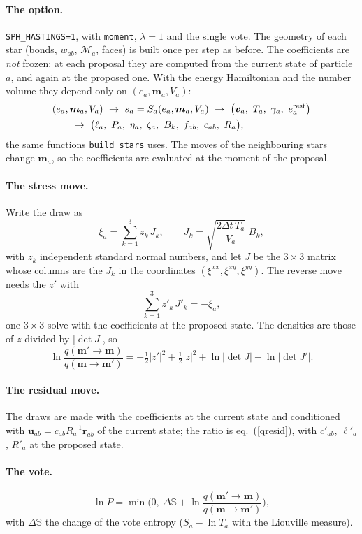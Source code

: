 \documentclass[11pt,aps,preprint,nofootinbib,superscriptaddress,tightenlines]{revtex4-2}
\def\st{\begin{equation}}
\def\stp{\end{equation}}
\def\Eq#1{eq.~(\ref{#1})}
\let\oldparagraph\paragraph
\renewcommand{\paragraph}{\par\bigskip\oldparagraph}
\begin{document}
\paragraph{The option.}  \texttt{SPH\_HASTINGS=1}, with \texttt{moment}, $\lambda=1$ and the single vote.  The geometry of each star (bonds, $w_{ab}$, $\mathcal M_a$, faces) is
built once per step as before.  The coefficients are \emph{not} frozen: at each proposal they are computed from the current state of
particle $a$, and again at the proposed one.  With the energy Hamiltonian and the number volume they depend only on $(e_a,\bm m_a,V_a)$:
\st
\begin{aligned}
&(e_a,\bm m_a,V_a)\ \to\ s_a=S_a(e_a,\bm m_a,V_a)\ \to\ \big(\bm v_a,\ T_a,\ \gamma_a,\ e^{\rm rest}_a\big)\\
&\qquad\to\ \big(\ell_a,\ P_a,\ \eta_a,\ \zeta_a,\ B_k,\ f_{ab},\ c_{ab},\ R_a\big) ,
\end{aligned}
\stp
the same functions \texttt{build\_stars} uses.  The moves of the neighbouring stars change $\bm m_a$, so the coefficients are evaluated at
the moment of the proposal.

\paragraph{The stress move.}  Write the draw as
\st
\xi_a=\sum_{k=1}^3z_k\,J_k,\qquad J_k=\sqrt{\frac{2\Delta t\,T_a}{V_a}}\;B_k ,
\stp
with $z_k$ independent standard normal numbers, and let $J$ be the $3\times3$ matrix whose columns are the $J_k$ in the coordinates
$(\xi^{xx},\xi^{xy},\xi^{yy})$.  The reverse move needs the $z'$ with
\st
\sum_{k=1}^3z'_k\,J'_k=-\xi_a ,
\stp
one $3\times3$ solve with the coefficients at the proposed state.  The densities are those of $z$ divided by $|\det J|$, so
\st
\ln\frac{q(\bm m'\to\bm m)}{q(\bm m\to\bm m')}=-\tfrac12|z'|^2+\tfrac12|z|^2+\ln|\det J|-\ln|\det J'| .
\label{qstress2}
\stp

\paragraph{The residual move.}  The draws are made with the coefficients at the current state and conditioned with
$\bm u_{ab}=c_{ab}R_a^{-1}\bm r_{ab}$ of the current state; the ratio is \Eq{qresid}, with $c'_{ab}$, $\ell'_a$, $R'_a$ at the proposed state.

\paragraph{The vote.}
\st
\ln P=\min\Big(0,\ \Delta\mathbb S+\ln\frac{q(\bm m'\to\bm m)}{q(\bm m\to\bm m')}\Big) ,
\stp
with $\Delta\mathbb S$ the change of the vote entropy ($S_a-\ln T_a$ with the Liouville measure).
\end{document}
